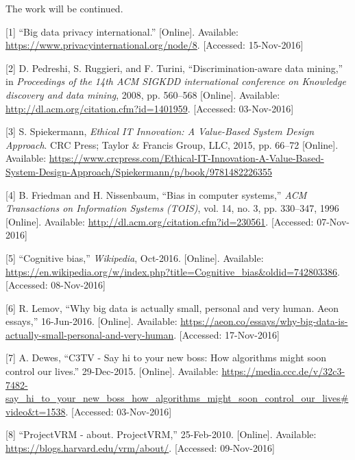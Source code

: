 \documentclass[12pt,english,a4paper,titlepage,cleardoublepage=empty,dottedtoc]{report}
\begin{document}
The work will be continued.

\hypertarget{refs}{}
\hypertarget{ref-web_2016_privacy-international-about-big-data}{}
{[}1{]} ``Big data privacy international.'' {[}Online{]}. Available:
\url{https://www.privacyinternational.org/node/8}. {[}Accessed:
15-Nov-2016{]}

\hypertarget{ref-paper_2008_discrimination-aware-data-mining}{}
{[}2{]} D. Pedreshi, S. Ruggieri, and F. Turini, ``Discrimination-aware
data mining,'' in \emph{Proceedings of the 14th ACM SIGKDD international
conference on Knowledge discovery and data mining}, 2008, pp. 560--568
{[}Online{]}. Available:
\url{http://dl.acm.org/citation.cfm?id=1401959}. {[}Accessed:
03-Nov-2016{]}

\hypertarget{ref-book_2015_ethical-it-innovation_ethical-uses-of-information-and-knowledge}{}
{[}3{]} S. Spiekermann, \emph{Ethical IT Innovation: A Value-Based
System Design Approach}. CRC Press; Taylor \& Francis Group, LLC, 2015,
pp. 66--72 {[}Online{]}. Available:
\url{https://www.crcpress.com/Ethical-IT-Innovation-A-Value-Based-System-Design-Approach/Spiekermann/p/book/9781482226355}

\hypertarget{ref-paper_1996_bias-in-computer-systems}{}
{[}4{]} B. Friedman and H. Nissenbaum, ``Bias in computer systems,''
\emph{ACM Transactions on Information Systems (TOIS)}, vol. 14, no. 3,
pp. 330--347, 1996 {[}Online{]}. Available:
\url{http://dl.acm.org/citation.cfm?id=230561}. {[}Accessed:
07-Nov-2016{]}

\hypertarget{ref-wikipedia_2016_cognitive-bias}{}
{[}5{]} ``Cognitive bias,'' \emph{Wikipedia}, Oct-2016. {[}Online{]}.
Available:
\url{https://en.wikipedia.org/w/index.php?title=Cognitive_bias\&oldid=742803386}.
{[}Accessed: 08-Nov-2016{]}

\hypertarget{ref-web_2016_big-data-is-people}{}
{[}6{]} R. Lemov, ``Why big data is actually small, personal and very
human. Aeon essays,'' 16-Jun-2016. {[}Online{]}. Available:
\url{https://aeon.co/essays/why-big-data-is-actually-small-personal-and-very-human}.
{[}Accessed: 17-Nov-2016{]}

\hypertarget{ref-video_2015_big-data-and-deep-learning_discrimination}{}
{[}7{]} A. Dewes, ``C3TV - Say hi to your new boss: How algorithms might
soon control our lives.'' 29-Dec-2015. {[}Online{]}. Available:
\url{https://media.ccc.de/v/32c3-7482-say_hi_to_your_new_boss_how_algorithms_might_soon_control_our_lives\#video\&t=1538}.
{[}Accessed: 03-Nov-2016{]}

\hypertarget{ref-web_2010_projectvrm_about}{}
{[}8{]} ``ProjectVRM - about. ProjectVRM,'' 25-Feb-2010. {[}Online{]}.
Available: \url{https://blogs.harvard.edu/vrm/about/}. {[}Accessed:
09-Nov-2016{]}
\end{document}
